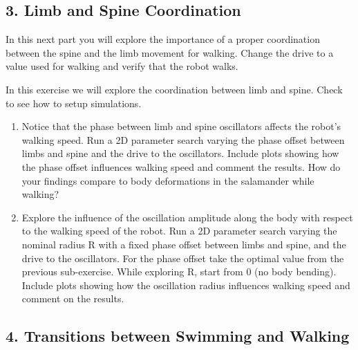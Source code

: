 \documentclass{cmc}
\begin{document}
\newpage
\subsection*{3. Limb and Spine Coordination}\label{sec:limb-spine-coordination}


In this next part you will explore the importance of a proper coordination between the spine and the
limb movement for walking. Change the drive to a value used for walking and verify that the robot walks.

In this exercise we will explore the coordination between limb and spine. Check 
to see how to setup simulations.

\begin{enumerate}
\item Notice that the phase between limb and spine oscillators affects the robot's walking speed. Run
a 2D parameter search varying the phase offset between limbs and spine and the drive to the oscillators.
Include plots showing how the phase offset influences walking speed and comment the
results. How do your findings compare to body deformations in the salamander while walking?

\item Explore the influence of the oscillation amplitude along the body with respect to the walking
speed of the robot. Run a 2D parameter search varying the nominal radius R with a fixed phase offset
between limbs and spine, and the drive to the oscillators. For the phase offset take the optimal value from the previous
sub-exercise. While exploring R, start from 0 (no body bending).
Include plots showing how the oscillation radius influences walking speed and comment on the results.
\end{enumerate}



\newpage
\subsection*{4. Transitions between Swimming and Walking}\label{sec:transitions}
\end{document}

